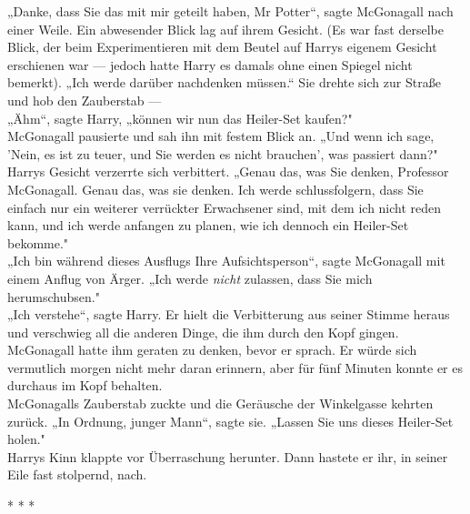 {„Danke, dass Sie das mit mir geteilt haben, Mr Potter“, sagte McGonagall nach einer Weile. Ein abwesender Blick lag auf ihrem Gesicht. (Es war fast derselbe Blick, der beim Experimentieren mit dem Beutel auf Harrys eigenem Gesicht erschienen war --- jedoch hatte Harry es damals ohne einen Spiegel nicht bemerkt). „Ich werde darüber nachdenken müssen.“ Sie drehte sich zur Straße und hob den Zauberstab ---\\ „Ähm“, sagte Harry, „können wir nun das Heiler-Set kaufen?"\\ McGonagall pausierte und sah ihn mit festem Blick an. „Und wenn ich sage, 'Nein, es ist zu teuer, und Sie werden es nicht brauchen', was passiert dann?"\\ Harrys Gesicht verzerrte sich verbittert. „Genau das, was Sie denken, Professor McGonagall. Genau das, was sie denken. Ich werde schlussfolgern, dass Sie einfach nur ein weiterer verrückter Erwachsener sind, mit dem ich nicht reden kann, und ich werde anfangen zu planen, wie ich dennoch ein Heiler-Set bekomme."\\ „Ich bin während dieses Ausflugs Ihre Aufsichtsperson“, sagte McGonagall mit einem Anflug von Ärger. „Ich werde \emph{nicht} zulassen, dass Sie mich herumschubsen."\\ „Ich verstehe“, sagte Harry. Er hielt die Verbitterung aus seiner Stimme heraus und verschwieg all die anderen Dinge, die ihm durch den Kopf gingen. McGonagall hatte ihm geraten zu denken, bevor er sprach. Er würde sich vermutlich morgen nicht mehr daran erinnern, aber für fünf Minuten konnte er es durchaus im Kopf behalten.\\ McGonagalls Zauberstab zuckte und die Geräusche der Winkelgasse kehrten zurück. „In Ordnung, junger Mann“, sagte sie. „Lassen Sie uns dieses Heiler-Set holen."\\ Harrys Kinn klappte vor Überraschung herunter. Dann hastete er ihr, in seiner Eile fast stolpernd, nach.

* * *

}
